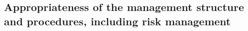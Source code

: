 \documentclass[11pt, a4paper]{article}
\begin{document}
\vspace{3cm}





\vspace{-3.5cm}


\subsection{Appropriateness of the management structure and procedures, including risk
 management}

\end{document}
